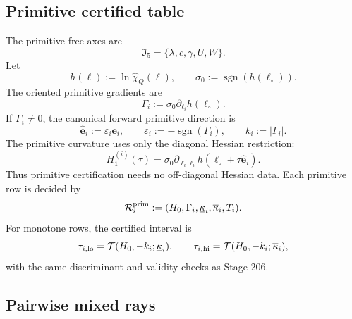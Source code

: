 \subsection{Primitive certified table}
\label{subsec:app-part06-primitive-certified-table}

The primitive free axes are
\begin{equation}
\label{eq:app-part06-primitive-axes}
\mathfrak I_5=\{\lambda,c,\gamma,U,W\}.
\end{equation}
Let
\begin{equation}
\label{eq:app-part06-h-log-def}
h(\boldsymbol\ell):=\ln\widehat\chi_Q(\boldsymbol\ell),
\qquad
\sigma_0:=\operatorname{sgn}(h(\boldsymbol\ell_\circ)).
\end{equation}
The oriented primitive gradients are
\begin{equation}
\label{eq:app-part06-Gamma-i}
\Gamma_i:=\sigma_0\partial_{\ell_i}h(\boldsymbol\ell_\circ).
\end{equation}
If \(\Gamma_i\neq0\), the canonical forward primitive direction is
\begin{equation}
\label{eq:app-part06-primitive-orientation}
\widehat{\mathbf e}_i:=\varepsilon_i\mathbf e_i,
\qquad
\varepsilon_i:=-\operatorname{sgn}(\Gamma_i),
\qquad
k_i:=|\Gamma_i|.
\end{equation}
The primitive curvature uses only the diagonal Hessian restriction:
\begin{equation}
\label{eq:app-part06-primitive-diagonal-Hessian}
H_1^{(i)}(\tau)
=
\sigma_0\partial_{\ell_i\ell_i}h(\boldsymbol\ell_\circ+\tau\widehat{\mathbf e}_i).
\end{equation}
Thus primitive certification needs no off-diagonal Hessian data.  Each primitive row is decided by
\begin{equation}
\label{eq:app-part06-primitive-row-data}
\mathcal R_i^{\rm prim}:=(H_0,\Gamma_i,\underline\kappa_i,\overline\kappa_i,T_i).
\end{equation}
For monotone rows, the certified interval is
\begin{equation}
\label{eq:app-part06-primitive-interval}
\tau_{i,\rm lo}=\mathcal T(H_0,-k_i;\underline\kappa_i),
\qquad
\tau_{i,\rm hi}=\mathcal T(H_0,-k_i;\overline\kappa_i),
\end{equation}
with the same discriminant and validity checks as Stage 206.

\subsection{Pairwise mixed rays}
\label{subsec:app-part06-pairwise-mixed-rays}

